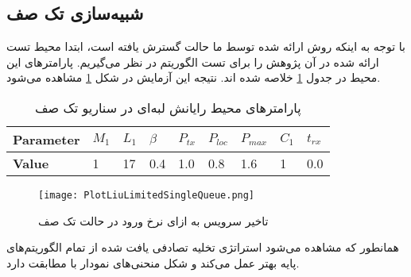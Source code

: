 \subsection{شبیه‌سازی تک صف}
با توجه به اینکه روش ارائه شده توسط ما حالت گسترش یافته \cite{Liu} است، ابتدا محیط تست ارائه شده در آن پژوهش را برای تست الگوریتم در نظر می‌گیریم. پارامترهای این محیط در جدول \ref{table:parameters-singlequeue} خلاصه شده اند. نتیجه این آزمایش در شکل \ref{plot:singleQueue} مشاهده می‌شود.

\begin{table}[H]
	\centering
	\begin{latin}
		\begin{tabular}{@{}lllllllll@{}}
			\toprule
			\textbf{Parameter} & $M_1$ & $L_1$ & $\beta$ & $P_{tx}$ & $P_{loc}$ & $P_{max}$ & $C_1$ & $t_{rx}$ \\ \midrule
			\textbf{Value}             & 1    & 17   & 0.4  & 1.0 & 0.8  & 1.6  & 1    & 0.0   \\ \bottomrule
		\end{tabular}
	\end{latin}
	\caption{پارامترهای محیط رایانش لبه‌ای در سناریو تک صف}
	\label{table:parameters-singlequeue}
\end{table}

\begin{figure}[H]
	\centering
	\texttt{[image: PlotLiuLimitedSingleQueue.png]}
	\caption{تاخیر سرویس به ازای نرخ ورود در حالت تک صف}
	\label{plot:singleQueue}
\end{figure}
همانطور که مشاهده می‌شود استراتژی تخلیه تصادفی یافت شده از تمام الگوریتم‌های پایه بهتر عمل می‌کند و شکل منحنی‌های نمودار با \cite{Liu} مطابقت دارد.
\newpage

